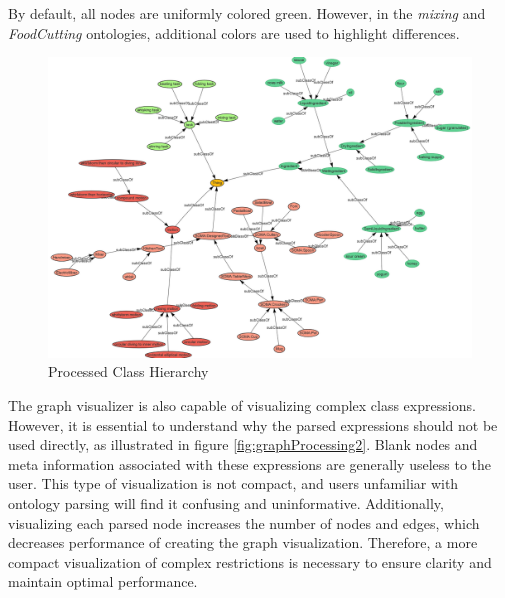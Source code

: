 By default, all nodes are uniformly colored green. However, in the \textit{mixing} and \textit{FoodCutting} \cite{Kuempel2024} ontologies, 
additional colors are used to highlight differences.
\begin{figure}[H]
    \includegraphics[scale=0.5]{Graphics/OwlVisualizer/graphProcessing1.png}
    \centering
    \caption{Processed Class Hierarchy}
\end{figure}

The graph visualizer is also capable of visualizing complex class expressions. 
However, it is essential to understand why the parsed expressions should not be used directly, as illustrated in figure \ref{fig:graphProcessing2}. 
Blank nodes and meta information associated with these expressions are generally useless to the user. 
This type of visualization is not compact, and users unfamiliar with ontology parsing will find it confusing and uninformative. 
Additionally, visualizing each parsed node increases the number of nodes and edges, which decreases performance of creating the graph visualization. 
Therefore, a more compact visualization of complex restrictions is necessary to ensure clarity and maintain optimal performance.

